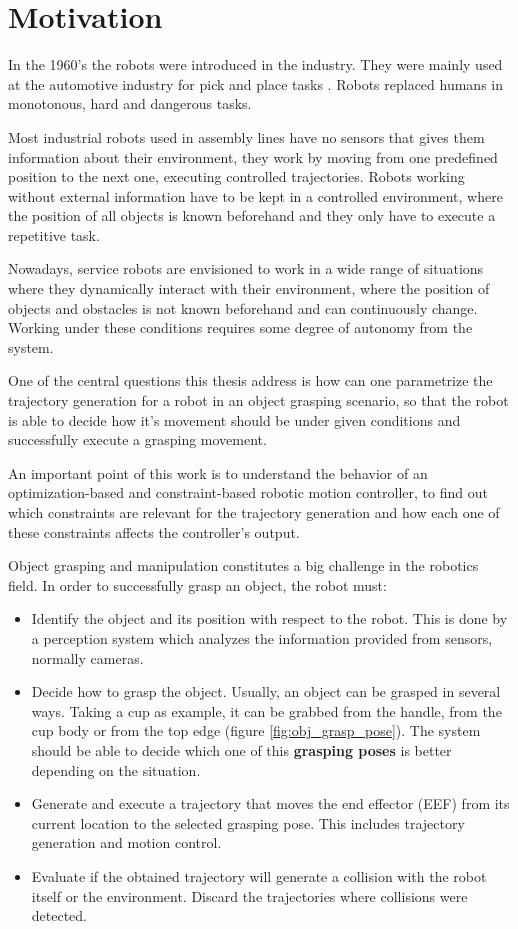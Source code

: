 \section{Motivation}
In the 1960's the robots were introduced in the industry. They were mainly used at the automotive industry for pick and place tasks  \citep{history}. Robots replaced humans in monotonous, hard and dangerous tasks. 

Most industrial robots used in assembly lines have no sensors that gives them information about their environment, they work by moving from one predefined position to the next one, executing controlled trajectories. Robots working without external information have to be kept in a controlled environment, where the position of all objects is known beforehand and they only have to execute a repetitive task.

Nowadays, service robots are envisioned to work in a wide range of situations where they dynamically interact with their environment, where the position of objects and obstacles is not known beforehand and can continuously change. Working under these conditions requires some degree of autonomy from the system.

One of the central questions this thesis address is how can one parametrize the trajectory generation for a robot in an object grasping scenario, so that the robot is able to decide how it's movement should be under given conditions and successfully execute a grasping movement.

An important point of this work is to understand the behavior of an optimization-based and constraint-based robotic motion controller, to find out which constraints are relevant for the trajectory generation and how each one of these constraints affects the controller's output.

Object grasping and manipulation  constitutes a big challenge in the robotics field. In order to successfully grasp an object, the robot must:
\begin{itemize}
	\item Identify the object and its position with respect to the robot. This is done by a perception system which analyzes the information provided from sensors, normally cameras.
	\item Decide how to grasp the object. Usually, an object can be grasped in several ways. Taking a cup as example, it can be grabbed from the handle, from the cup body or from the top edge (figure \ref{fig:obj_grasp_pose}). The system should be able to decide which one of this \textbf{grasping poses} is better depending on the situation.
	\item Generate and execute a trajectory that moves the end effector (EEF) from its current location to the selected grasping pose. This includes trajectory generation and motion control.
	\item Evaluate if the obtained trajectory will generate a collision with the robot itself or the environment. Discard the trajectories where collisions were detected.
\end{itemize}

